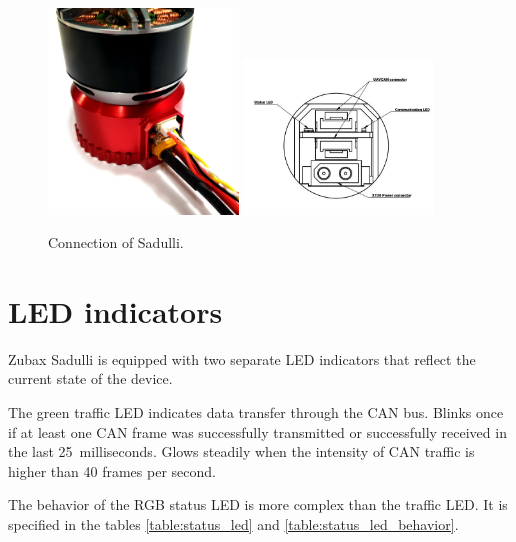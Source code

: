 \documentclass{zubaxdoc}
\begin{document}
\begin{figure}[hb]
    \includegraphics[width=0.45\textwidth]{sadulli-connectors} \includegraphics[width=0.45\textwidth]{connectors}
    \caption{Connection of Sadulli.
    \label{Sadulli_connectors}}
\end{figure}


\section{LED indicators}

\newcommand{\LEDX}{{\rule{0.4em}{1.0em}}}
\newcommand{\LEDO}{{\rule{0.4em}{0.1em}}}

\newcommand{\ShowColor}[1]{{\color{#1}\rule{2em}{0.8em}}}

Zubax Sadulli is equipped with two separate LED indicators that reflect the current state of the device.

The green traffic LED indicates data transfer through the CAN bus. Blinks once if at least one CAN frame was successfully transmitted or successfully received in the last 25~milliseconds. Glows steadily when the intensity of CAN traffic is higher than 40 frames per second.

The behavior of the RGB status LED is more complex than the traffic LED. 
It is specified in the tables \ref{table:status_led} and \ref{table:status_led_behavior}.
\end{document}
